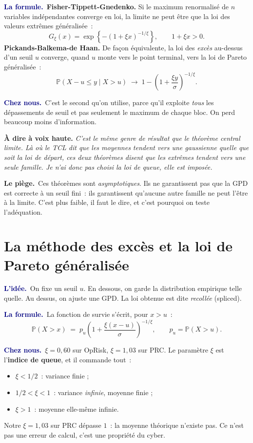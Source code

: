 \documentclass[11pt,a4paper]{article}
\newcommand{\lidee}[1]{\smallskip\noindent\textcolor{navy}{\textbf{L'idée.}}\ #1\par}
\newcommand{\laformule}[1]{\smallskip\noindent\textcolor{navy}{\textbf{La formule.}}\ #1\par}
\newcommand{\cheznous}[1]{\smallskip\noindent\textcolor{navy}{\textbf{Chez nous.}}\ #1\par}
\newcommand{\lepiege}[1]{\smallskip\noindent\textcolor{accent}{\textbf{Le piège.}}\ #1\par}
\newcommand{\laphrase}[1]{\begin{phrasebox}\textbf{À dire à voix haute.} \emph{#1}\end{phrasebox}}
\begin{document}
\laformule{\textbf{Fisher-Tippett-Gnedenko.} Si le maximum renormalisé de $n$ variables
indépendantes converge en loi, la limite ne peut être que la loi des valeurs extrêmes
généralisée~:
\[
  G_\xi(x)=\exp\!\left\{-\left(1+\xi x\right)^{-1/\xi}\right\}, \qquad 1+\xi x>0 .
\]
\textbf{Pickands-Balkema-de Haan.} De façon équivalente, la loi des \emph{excès} au-dessus
d'un seuil $u$ converge, quand $u$ monte vers le point terminal, vers la loi de Pareto
généralisée~:
\[
  \mathbb{P}(X-u\le y \mid X>u)\;\longrightarrow\;
  1-\left(1+\frac{\xi y}{\sigma}\right)^{-1/\xi}.
\]}

\cheznous{C'est le second qu'on utilise, parce qu'il exploite \emph{tous} les dépassements
de seuil et pas seulement le maximum de chaque bloc. On perd beaucoup moins d'information.}

\laphrase{C'est le même genre de résultat que le théorème central limite. Là où le TCL dit
que les moyennes tendent vers une gaussienne quelle que soit la loi de départ, ces deux
théorèmes disent que les extrêmes tendent vers une seule famille. Je n'ai donc pas
\emph{choisi} la loi de queue, elle est imposée.}

\lepiege{Ces théorèmes sont \emph{asymptotiques}. Ils ne garantissent pas que la GPD est
correcte à un seuil fini~: ils garantissent qu'aucune autre famille ne peut l'être à la
limite. C'est plus faible, il faut le dire, et c'est pourquoi on teste l'adéquation.}

\section{La méthode des excès et la loi de Pareto généralisée}

\lidee{On fixe un seuil $u$. En dessous, on garde la distribution empirique telle quelle. Au
dessus, on ajuste une GPD. La loi obtenue est dite \emph{recollée} (spliced).}

\laformule{La fonction de survie s'écrit, pour $x>u$~:
\[
  \mathbb{P}(X>x)\;=\;p_u\left(1+\frac{\xi (x-u)}{\sigma}\right)^{-1/\xi},
  \qquad p_u=\mathbb{P}(X>u).
\]}

\cheznous{$\xi=0{,}60$ sur OpRisk, $\xi=1{,}03$ sur PRC. Le paramètre $\xi$ est
l'\textbf{indice de queue}, et il commande tout~:
\begin{itemize}[itemsep=1pt,topsep=2pt]
\item $\xi<1/2$~: variance finie ;
\item $1/2<\xi<1$~: variance \emph{infinie}, moyenne finie ;
\item $\xi>1$~: moyenne elle-même infinie.
\end{itemize}
Notre $\xi=1{,}03$ sur PRC dépasse $1$~: la moyenne théorique n'existe pas. Ce n'est pas une
erreur de calcul, c'est une propriété du cyber.}
\end{document}
